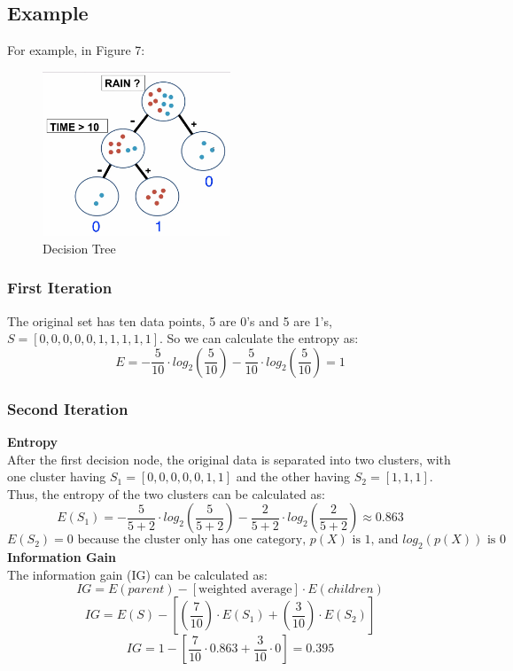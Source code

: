\documentclass[12pt]{article}
\begin{document}
\subsection{Example}
For example, in Figure 7:
\begin{figure}[h]
\begin{center}
\includegraphics[width = 0.5\textwidth]{Images/Decision Tree.png}
\caption{Decision Tree}
\label{default}
\end{center}
\end{figure}
\subsubsection{First Iteration}
The original set has ten data points, 5 are 0's and 5 are 1's, $S = [0, 0, 0, 0, 0, 1, 1, 1, 1, 1]$. So we can calculate the entropy as:
$$E = -\frac{5}{10}\cdot log_2(\frac{5}{10}) - \frac{5}{10}\cdot log_2(\frac{5}{10}) = 1$$

\subsubsection{Second Iteration}
\textbf{Entropy}\\
After the first decision node, the original data is separated into two clusters, with one cluster having $S_1 = [0, 0, 0, 0, 0, 1, 1]$ and the other having $S_2 = [1, 1, 1]$. Thus, the entropy of the two clusters can be calculated as:
$$E(S_1) = -\frac{5}{5+2}\cdot log_2(\frac{5}{5+2}) - \frac{2}{5+2}\cdot log_2(\frac{2}{5+2}) \approx  0.863$$
$$E(S_2) = 0 \text{ because the cluster only has one category, }p(X)\text{ is 1, and }log_2(p(X))\text{ is 0}$$
\textbf{Information Gain}\\
The information gain (IG) can be calculated as:
$$IG = E(parent) - [\text{weighted average}]\cdot E(children)$$
$$IG = E(S) - [(\frac{7}{10})\cdot E(S_1) + (\frac{3}{10})\cdot E(S_2)]$$
$$IG = 1 - [\frac{7}{10}\cdot 0.863 + \frac{3}{10}\cdot 0] = 0.395$$
\newpage
\end{document}
